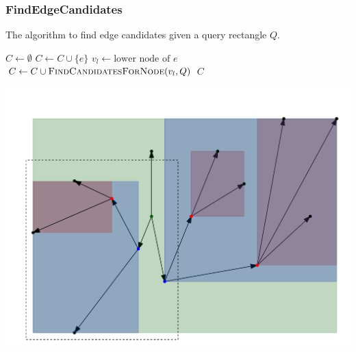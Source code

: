 \documentclass[10pt, t,
aspectratio=169,%
]{beamer}
\newcommand{\findEdgeCandidates}{FindEdgeCandidates\xspace}
\begin{document}
\begin{frame}
	\frametitle{\findEdgeCandidates}
	\begin{algorithm}[H]
		\renewcommand{\thealgorithm}{}
		{\tiny
			\caption{The algorithm to find edge candidates given a query rectangle $Q$.}
			\begin{algorithmic}[1]
				\State $C \gets \emptyset$
				\State $C \gets C \cup \{e\}$
				\EndIf
				\State $v_l \gets \text{lower node of $e$}$
				\State $C \gets C \cup \Call{FindCandidatesForNode}{v_l, Q}$
				\EndIf
				\EndFor
				\State \Return $C$
				\EndProcedure
			\end{algorithmic}
		}
	\end{algorithm}
	\includegraphics[width=.45\columnwidth]{images/containedDowngraphBox}
\end{frame}
\end{document}
